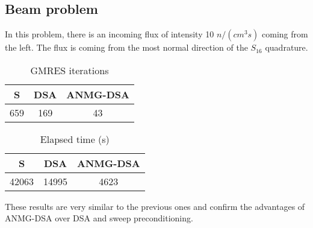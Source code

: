\subsection{Beam problem}
In this problem, there is an incoming flux of intensity 10 $n/(cm^3s)$ 
coming from the left. The flux is coming from the most normal direction 
of the $S_{16}$ quadrature. 
\begin{table}[H]
\begin{center}
\begin{tabular}{|c|c|c|}
\hline  
S & DSA & ANMG-DSA \\
\hline
659 & 169 & 43 \\
\hline
\end{tabular}
\caption{GMRES iterations}
\end{center}
\end{table}
\begin{table}[H]
\begin{center}
\begin{tabular}{|c|c|c|}
\hline  
S & DSA & ANMG-DSA \\
\hline
42063 & 14995 & 4623\\
\hline
\end{tabular}
\caption{Elapsed time (s)}
\end{center}
\end{table}
These results are very similar to the previous ones and confirm the advantages
of ANMG-DSA over DSA and sweep preconditioning. 
